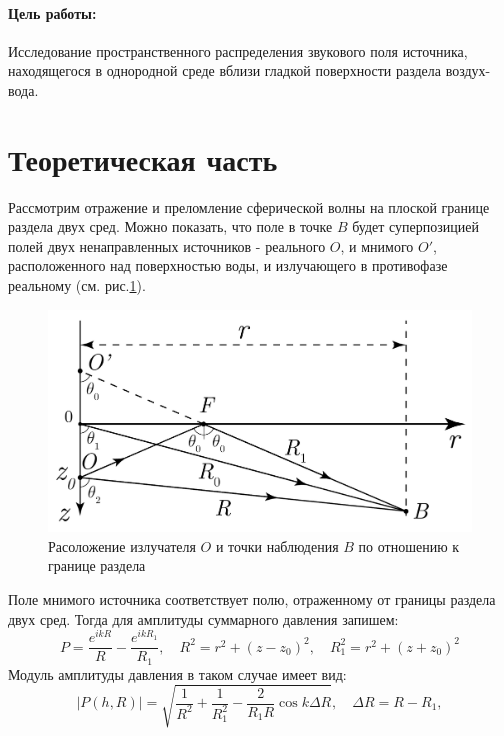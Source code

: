 

\def\labauthors{Виноградов И.Д., Шиков А.П.}
\def\labgroup{440}
\def\labnumber{1}
\def\labtheme{Исследование акустического поля в однородной среде с плоской границей}
\def\department{Кафедра акустики}
\newcommand{\D}[1]{D\qty[#1]}


\paragraph{Цель работы:} 
Исследование пространственного распределения звукового поля источника, находящегося в однородной среде вблизи гладкой
поверхности раздела воздух-вода.

\section{Теоретическая часть}
Рассмотрим отражение и преломление сферической волны на плоской границе раздела двух сред. Можно показать, что поле в
точке $B$ будет суперпозицией полей двух ненаправленных источников - реального $O$, и мнимого $O'$, расположенного над поверхностью
воды, и излучающего в противофазе реальному (см. рис.\ref{fig:scheme}).
\begin{figure}[h!]
	\centering
	\includegraphics[width =0.6\linewidth]{fig/scheme.pdf}
	\caption{Расоложение излучателя $O$ и точки наблюдения $B$ по отношению к границе раздела}
	\label{fig:scheme}
\end{figure}
Поле мнимого источника соответствует полю, отраженному от границы раздела двух сред. Тогда для амплитуды суммарного давления запишем:
\begin{equation}
	P = \frac{e^{ikR}}{R}-\frac{e^{ikR_1}}{R_1}, \quad R^2 = r^2+(z-z_0)^2, \quad R_1^2 = r^2+(z+z_0)^2
	\label{eq:1}
\end{equation}
Модуль амплитуды давления в таком случае имеет вид:
\begin{equation}
	|P(h,R)| = \sqrt{ \frac{1}{R^2} + \frac{1}{R_1^2} - \frac{2}{R_1 R} \cos k \Delta R },\quad \Delta R = R-R_1,
	\label{eq:2}
\end{equation}
